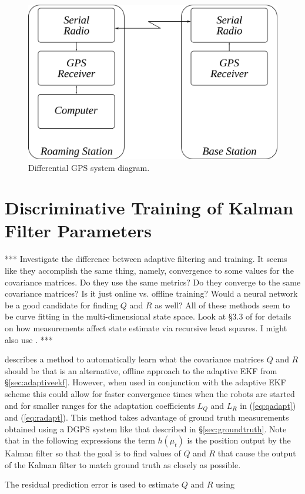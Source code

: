 \begin{figure}[ht!]
	\centering
	\includegraphics[width=.6\textwidth]{images/dgps}
	\caption{Differential GPS system diagram.}
	\label{fig:dgps}
\end{figure}

\section{Discriminative Training of Kalman Filter Parameters}
\label{sec:trainingkfparams}
*** Investigate the difference between adaptive filtering and training. It seems like they accomplish the same thing, namely, convergence to some values for the covariance matrices. Do they use the same metrics? Do they converge to the same covariance matrices? Is it just online vs. offline training? Would a neural network be a good candidate for finding $Q$ and $R$ as well? All of these methods seem to be curve fitting in the multi-dimensional state space. Look at \S3.3 of \cite{Simon06OptimalEstimation} for details on how measurements affect state estimate via recursive least squares. I might also use \cite{Orderud05}. ***

\cite{Abbeel-RSS-05} describes a method to automatically learn what the covariance matrices $Q$ and $R$ should be that is an alternative, offline approach to the adaptive EKF from \S\ref{sec:adaptiveekf}. However, when used in conjunction with the adaptive EKF scheme this could allow for faster convergence times when the robots are started and for smaller ranges for the adaptation coefficients $L_Q$ and $L_R$ in (\ref{eq:qadapt}) and (\ref{eq:radapt}). This method takes advantage of ground truth measurements obtained using a DGPS system like that described in \S\ref{sec:groundtruth}. Note that in the following expressions the term $h(\mu_t)$ is the position output by the Kalman filter so that the goal is to find values of $Q$ and $R$ that cause the output of the Kalman filter to match ground truth as closely as possible.

The residual prediction error is used to estimate $Q$ and $R$ using

